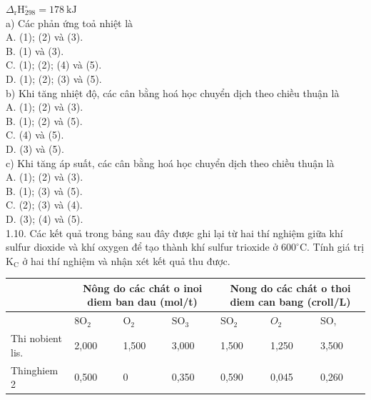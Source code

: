 \documentclass[10pt]{article}
\begin{document}
$\Delta_{\mathrm{r}} \mathrm{H}_{298}^{\circ}=178 \mathrm{~kJ}$\\
a) Các phản ứng toả nhiệt là\\
A. (1); (2) và (3).\\
B. (1) và (3).\\
C. (1); (2); (4) và (5).\\
D. (1); (2); (3) và (5).\\
b) Khi tăng nhiệt độ, các cân bằng hoá học chuyển dịch theo chiều thuận là\\
A. (1); (2) và (3).\\
B. (1); (2) và (5).\\
C. (4) và (5).\\
D. (3) và (5).\\
c) Khi tăng áp suất, các cân bằng hoá học chuyển dịch theo chiều thuận là\\
A. (1); (2) và (3).\\
B. (1); (3) và (5).\\
C. (2); (3) và (4).\\
D. (3); (4) và (5).\\
1.10. Các kết quả trong bảng sau đây được ghi lại từ hai thí nghiệm giữa khí sulfur dioxide và khí oxygen để tạo thành khí sulfur trioxide ở $600^{\circ} \mathrm{C}$. Tính giá trị $\mathrm{K}_{\mathrm{C}}$ ở hai thí nghiệm và nhận xét kết quả thu được.

\begin{center}
\begin{tabular}{|l|l|l|l|l|l|l|}
\hline
\multirow{2}{*}{} & \multicolumn{3}{|c|}{Nông do các chát o inoi diem ban dau (mol/t)} & \multicolumn{3}{|c|}{Nong do các chát o thoi diem can bang (croll/L)} \\
\hline
 & $8 \mathrm{O}_{2}$ & $\mathrm{O}_{2}$ & $\mathrm{SO}_{3}$ & $\mathrm{SO}_{2}$ & $O_{2}$ & SO, \\
\hline
Thi nobient lis. & 2,000 & 1,500 & 3,000 & 1,500 & 1,250 & 3,500 \\
\hline
Thinghiem 2 & 0,500 & 0 & 0,350 & 0,590 & 0,045 & 0,260 \\
\hline
\end{tabular}
\end{center}
\end{document}
